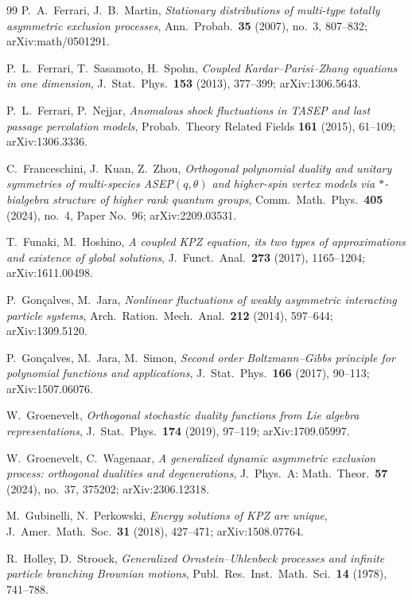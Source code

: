 \documentclass[11pt]{article}
\theoremstyle{plain}
\theoremstyle{definition}
\theoremstyle{remark}
\begin{document}
\begin{thebibliography}{99}
 P.~A.~Ferrari, J.~B.~Martin, \emph{Stationary distributions
of multi-type totally asymmetric exclusion processes}, Ann.~Probab.~\textbf{35}
(2007), no.~3, 807--832; arXiv:math/0501291.

 P.~L.~Ferrari, T.~Sasamoto, H.~Spohn, \emph{Coupled
Kardar--Parisi--Zhang equations in one dimension}, J.~Stat.~Phys.~\textbf{153}
(2013), 377--399; arXiv:1306.5643.

 P.~L.~Ferrari, P.~Nejjar, \emph{Anomalous shock
fluctuations in TASEP and last passage percolation models}, Probab.~Theory
Related Fields \textbf{161} (2015), 61--109; arXiv:1306.3336.

 C.~Franceschini, J.~Kuan, Z.~Zhou, \emph{Orthogonal polynomial duality
and unitary symmetries of multi-species ASEP$(q,\theta)$ and higher-spin vertex
models via $\ast$-bialgebra structure of higher rank quantum groups},
Comm.~Math.~Phys.~\textbf{405} (2024), no.~4, Paper No.~96; arXiv:2209.03531.

 T.~Funaki, M.~Hoshino, \emph{A coupled KPZ equation, its
two types of approximations and existence of global solutions},
J.~Funct.~Anal.~\textbf{273} (2017), 1165--1204; arXiv:1611.00498.

 P.~Gon\c{c}alves, M.~Jara, \emph{Nonlinear fluctuations of weakly asymmetric
interacting particle systems}, Arch.~Ration.~Mech.~Anal.~\textbf{212} (2014), 597--644;
arXiv:1309.5120.

 P.~Gon\c{c}alves, M.~Jara, M.~Simon, \emph{Second order Boltzmann--Gibbs
principle for polynomial functions and applications}, J.~Stat.~Phys.~\textbf{166} (2017),
90--113; arXiv:1507.06076.

 W.~Groenevelt, \emph{Orthogonal stochastic duality functions from Lie
algebra representations}, J.~Stat.~Phys.~\textbf{174} (2019), 97--119; arXiv:1709.05997.

 W.~Groenevelt, C.~Wagenaar, \emph{A generalized dynamic
asymmetric exclusion process: orthogonal dualities and degenerations},
J.~Phys.~A: Math.~Theor.~\textbf{57} (2024), no.~37, 375202; arXiv:2306.12318.

 M.~Gubinelli, N.~Perkowski, \emph{Energy solutions of KPZ are unique},
J.~Amer.~Math.~Soc.~\textbf{31} (2018), 427--471; arXiv:1508.07764.

 R.~Holley, D.~Stroock, \emph{Generalized Ornstein--Uhlenbeck
processes and infinite particle branching Brownian motions},
Publ.~Res.~Inst.~Math.~Sci.~\textbf{14} (1978), 741--788.


\end{thebibliography}
\end{document}
